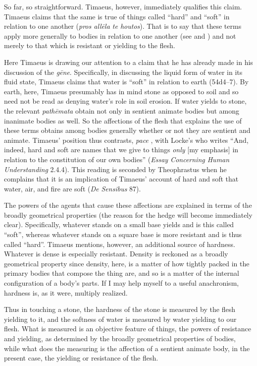 So far, so straightforward. Timaeus, however, immediately qualifies this claim. Timaeus claims that the same is true of things called ``hard'' and ``soft'' in relation to one another (\emph{pros allēla te houtos}). That is to say that these terms apply more generally to bodies in relation to one another (see \citealt[228, n6]{Archer-Hind:1888qd} and \citealt[110]{OBrien:1984ji}) and not merely to that which is resistant or yielding to the flesh.

Here Timaeus is drawing our attention to a claim that he has already made in his discussion of the \emph{gēne}. Specifically, in discussing the liquid form of water in its fluid state, Timaeus claims that water is ``soft'' in relation to earth (54d4--7). By earth, here, Timaeus presumably has in mind stone as opposed to soil and so need not be read as denying water's role in soil erosion. If water yields to stone, the relevant \emph{pathēmata} obtain not only in sentient animate bodies but among inanimate bodies as well. So the affections of the flesh that explains the use of these terms obtains among bodies generally whether or not they are sentient and animate. Timaeus' position thus contrasts, \emph{pace} \citet[185, n2]{Beare:1906uq}, with Locke's who writes ``And, indeed, hard and soft are names that we give to things \emph{only} [my emphasis] in relation to the constitution of our own bodies'' (\emph{Essay Concerning Human Understanding} 2.4.4). This reading is seconded by Theophrastus when he complains that it is an implication of Timaeus' account of hard and soft that water, air, and fire are soft (\emph{De Sensibus} 87).

The powers of the agents that cause these affections are explained in terms of the broadly geometrical properties (the reason for the hedge will become immediately clear). Specifically, whatever stands on a small base yields and is this called ``soft'', whereas whatever stands on a square base is more resistant and is thus called ``hard''. Timaeus mentions, however, an additional source of hardness. Whatever is dense is especially resistant. Density is reckoned as a broadly geometrical property since density, here, is a matter of how tightly packed in the primary bodies that compose the thing are, and so is a matter of the internal configuration of a body's parts. If I may help myself to a useful anachronism, hardness is, as it were, multiply realized.

Thus in touching a stone, the hardness of the stone is measured by the flesh yielding to it, and the softness of water is measured by water yielding to our flesh. What is measured is an objective feature of things, the powers of resistance and yielding, as determined by the broadly geometrical properties of bodies, while what does the measuring is the affection of a sentient animate body, in the present case, the yielding or resistance of the flesh.

